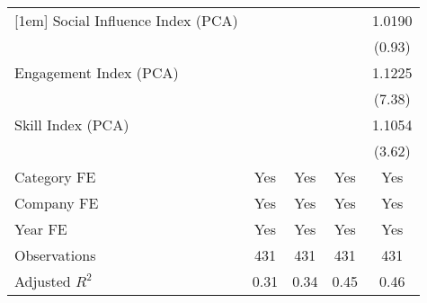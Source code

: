 {\begin{tabular}{l*{4}{c}}
[1em]
Social Influence Index (PCA)       &                     &                     &                     &      1.0190         \\
                                   &                     &                     &                     &      (0.93)         \\
[1em]
Engagement Index (PCA)             &                     &                     &                     &      1.1225\sym{***}\\
                                   &                     &                     &                     &      (7.38)         \\
[1em]
Skill Index (PCA)                  &                     &                     &                     &      1.1054\sym{***}\\
                                   &                     &                     &                     &      (3.62)         \\
[1em]
Category FE                        &         Yes         &         Yes         &         Yes         &         Yes         \\
[1em]
Company FE                         &         Yes         &         Yes         &         Yes         &         Yes         \\
[1em]
Year FE                            &         Yes         &         Yes         &         Yes         &         Yes         \\
\hline
Observations                       &         431         &         431         &         431         &         431         \\
Adjusted \(R^{2}\)                 &        0.31         &        0.34         &        0.45         &        0.46         \\
\hline\hline
\end{tabular}
}
